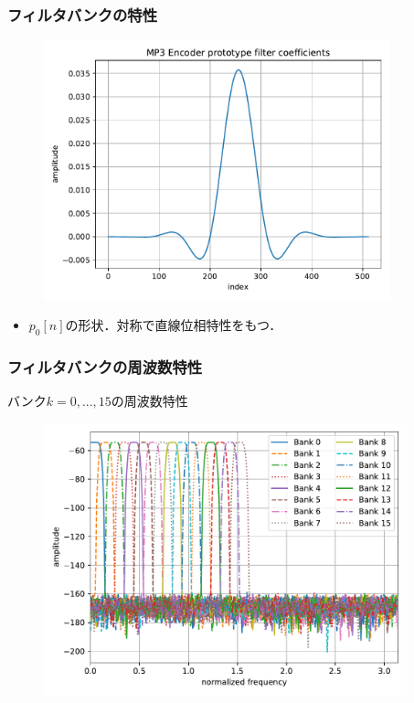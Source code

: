 \documentclass[14pt,xcolor=dvipsnames,table,dvipdfmx]{beamer}
\begin{document}
\begin{frame}[c]
    \frametitle{フィルタバンクの特性}
    \vspace{-5pt}
    \begin{figure}
        \includegraphics[width=100mm]{./figs/mp3_encoder_prototype_filter_coef.pdf}
    \end{figure}
    \vspace{-5pt}
    \begin{itemize}
        \item $p_{0}[n]$の形状．対称で直線位相特性をもつ．
    \end{itemize}
\end{frame}

\begin{frame}[c]
    \frametitle{フィルタバンクの周波数特性}
    バンク$k = 0, ..., 15$の周波数特性
    \vspace{-5pt}
    \begin{figure}
        \includegraphics[width=105mm]{./figs/mp3_encoder_filter_bank_frequency_spec_0_15.pdf}
    \end{figure}
\end{frame}
\end{document}
